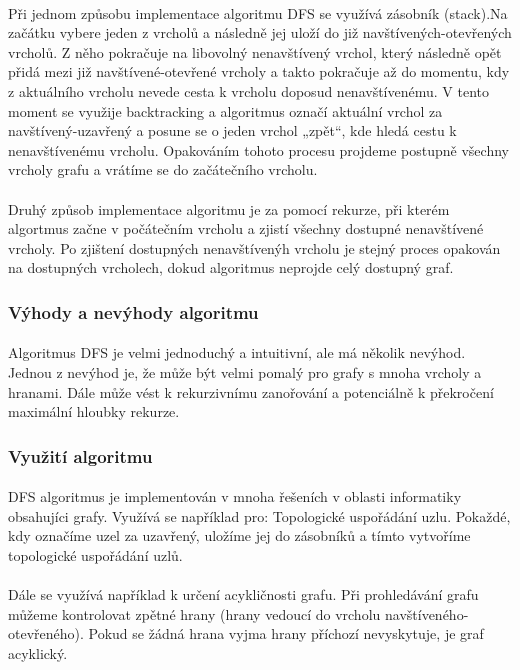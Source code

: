 \documentclass[12pt]{article}
\begin{document}
\paragraph{}
Při jednom způsobu implementace algoritmu DFS se využívá zásobník (stack).Na začátku vybere jeden z vrcholů a 
následně jej uloží do již navštívených-otevřených vrcholů. Z něho pokračuje na libovolný nenavštívený vrchol, 
který následně opět přidá mezi již navštívené-otevřené vrcholy a takto pokračuje až do momentu, kdy 
z aktuálního vrcholu nevede cesta k vrcholu doposud nenavštívenému. V tento moment se využije 
backtracking a algoritmus označí aktuální vrchol za navštívený-uzavřený a posune se o jeden vrchol 
„zpět“, kde hledá cestu k nenavštívenému vrcholu. Opakováním tohoto procesu projdeme postupně 
všechny vrcholy grafu a vrátíme se do začátečního vrcholu.
\paragraph{}
Druhý způsob implementace algoritmu je za pomocí rekurze, při kterém algortmus začne v 
počátečním vrcholu a zjistí všechny dostupné nenavštívené vrcholy. Po zjištení dostupných 
nenavštívenýh vrcholu je stejný proces opakován na dostupných vrcholech, dokud algoritmus 
neprojde celý dostupný graf.
\subsubsection{Výhody a nevýhody algoritmu}
\paragraph{}
Algoritmus DFS je velmi jednoduchý a intuitivní, ale má několik nevýhod. Jednou z 
nevýhod je, že může být velmi pomalý pro grafy s mnoha vrcholy a hranami. Dále může 
vést k rekurzivnímu zanořování a potenciálně k překročení maximální hloubky rekurze.
\subsubsection{Využití algoritmu}
\paragraph{}
DFS algoritmus je implementován v mnoha řešeních v oblasti informatiky obsahujíci grafy. 
Využívá se například pro: Topologické uspořádání uzlu. Pokaždé, kdy označíme uzel za uzavřený, 
uložíme jej do  zásobníků a tímto vytvoříme topologické uspořádání uzlů.
\paragraph{}
Dále se využívá například k určení acykličnosti grafu. Při prohledávání grafu můžeme kontrolovat zpětné hrany (hrany 
vedoucí do vrcholu navštíveného-otevřeného). Pokud se žádná hrana vyjma hrany příchozí 
nevyskytuje, je graf acyklický.
\end{document}
